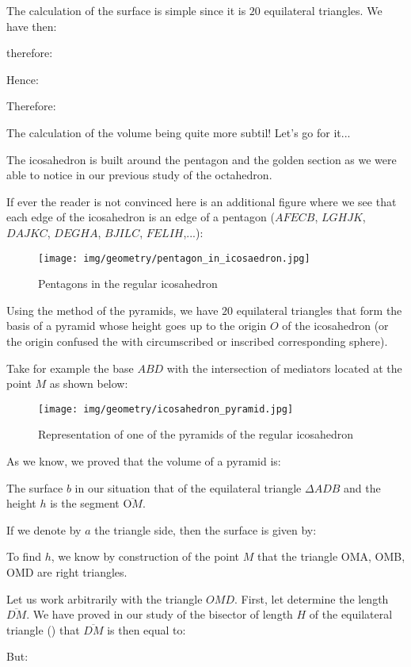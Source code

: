 {	The calculation of the surface is simple since it is $20$ equilateral triangles. We have then:
	
	therefore:
	
	Hence:
	
	Therefore:
	
	The calculation of the volume being quite more subtil! Let's go for it...
	
	The icosahedron is built around the pentagon and the golden section as we were able to notice in our previous study of the octahedron.
	
	If ever the reader is not convinced here is an additional figure where we see that each edge of the icosahedron is an edge of a pentagon ($AFECB$, $LGHJK$, $DAJKC$, $DEGHA$, $BJILC$, $FELIH$,...):
	\begin{figure}[H]
		\centering
		\texttt{[image: img/geometry/pentagon\_in\_icosaedron.jpg]}
		\caption{Pentagons in the regular icosahedron}
	\end{figure}
	Using the method of the pyramids, we have $20$ equilateral triangles that form the basis of a pyramid whose height goes up to the origin $O$ of the icosahedron (or the origin confused the with circumscribed or inscribed corresponding sphere).
	
	Take for example the base $ABD$ with the intersection of mediators located at the point $M$ as shown below:
	\begin{figure}[H]
		\centering
		\texttt{[image: img/geometry/icosahedron\_pyramid.jpg]}
		\caption{Representation of one of the pyramids of the regular icosahedron}
	\end{figure}
	As we know, we proved that the volume of a pyramid is:
	
	The surface $b$ in our situation that of the equilateral triangle $\Delta ADB$ and the height $h$ is the segment $\overline{\text{O}M}$.

	If we denote by $a$ the triangle side, then the surface is given by:
	
	To find $h$, we know by construction of the point $M$ that the triangle OMA, OMB, OMD are right triangles.

	Let us work arbitrarily with the triangle $OMD$. First, let determine the length $\overline{DM}$. We have proved in our study of the bisector of length $H$ of the equilateral triangle () that $\overline{DM}$ is then equal to:
	
	But:
	
}

